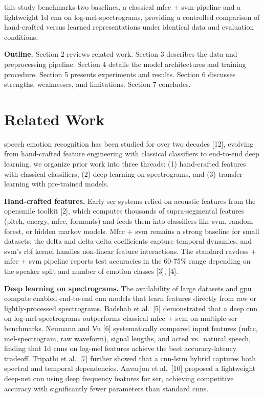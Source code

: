 \documentclass[conference]{IEEEtran}
\begin{document}
this study benchmarks two baselines, a classical mfcc + svm pipeline and a lightweight 1d cnn on log-mel-spectrograms, providing a controlled comparison of hand-crafted versus learned representations under identical data and evaluation conditions.


\textbf{Outline.} Section 2 reviews related work. Section 3 describes
the data and preprocessing pipeline. Section 4 details the model
architectures and training procedure. Section 5 presents experiments and
results. Section 6 discusses strengths, weaknesses, and limitations.
Section 7 concludes.


\section{Related Work}\label{related-work}

speech emotion recognition has been studied for over two decades {[}12{]},
evolving from hand-crafted feature engineering with classical
classifiers to end-to-end deep learning. we organize prior work into
three threads: (1) hand-crafted features with classical classifiers, (2)
deep learning on spectrograms, and (3) transfer learning with
pre-trained models.

\textbf{Hand-crafted features.} Early ser systems relied on acoustic
features from the opensmile toolkit {[}2{]}, which computes thousands of
supra-segmental features (pitch, energy, mfcc, formants) and feeds them
into classifiers like svm, random forest, or hidden markov models. Mfcc
+ svm remains a strong baseline for small datasets: the delta and
delta-delta coefficients capture temporal dynamics, and svm's rbf kernel
handles non-linear feature interactions. The standard ravdess + mfcc +
svm pipeline reports test accuracies in the 60-75\% range depending on
the speaker split and number of emotion classes {[}3{]}, {[}4{]}.

\textbf{Deep learning on spectrograms.} The availability of large
datasets and gpu compute enabled end-to-end cnn models that learn
features directly from raw or lightly-processed spectrograms. Badshah et
al.~{[}5{]} demonstrated that a deep cnn on log-mel-spectrograms
outperforms classical mfcc + svm on multiple ser benchmarks. Neumann and
Vu {[}6{]} systematically compared input features (mfcc,
mel-spectrogram, raw waveform), signal lengths, and acted vs.~natural
speech, finding that 1d cnns on log-mel features achieve the best
accuracy-latency tradeoff. Tripathi et al.~{[}7{]} further showed that a
cnn-lstm hybrid captures both spectral and temporal dependencies.
Anvarjon et al.~{[}10{]} proposed a lightweight
deep-net cnn using deep frequency features for ser, achieving competitive
accuracy with significantly fewer parameters than standard cnns.
\end{document}
